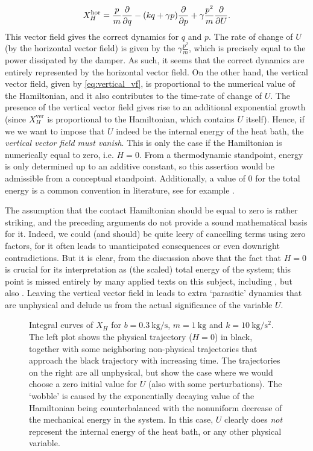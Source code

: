 $$ 
    X^\text{hor}_H = \frac{p}{m}\pdv{}{q} - ( kq + \gamma p)\pdv{}{p} + \gamma \frac{p^2}{m}\pdv{}{U}.
$$
This vector field gives the correct dynamics for $q$ and $p$. The rate of change of $U$ (by the horizontal vector field) is given by the $ 
\gamma \tfrac{p^2}{m}$, which is precisely equal to the power dissipated by the damper. As such, it seems that the correct dynamics are entirely represented by the horizontal vector field. On the other hand, the vertical vector field, given by \cref{eq:vertical_vf}, is proportional to the numerical value of the Hamiltonian, and it also contributes to the time-rate of change of $U$. The presence of the vertical vector field gives rise to an additional exponential growth (since $X_H^\text{ver}$ is proportional to the Hamiltonian, which contains $U$ itself). Hence, if we we want to impose that $U$ indeed be the internal energy of the heat bath, the \emph{vertical vector field must vanish}. This is only the case if the Hamiltonian is numerically equal to zero, i.e. $H = 0$. From a thermodynamic standpoint, energy is only determined up to an additive constant, so this assertion would be admissible from a conceptual standpoint. Additionally, a value of 0 for the total energy is a common convention in literature, see for example \citet{Fermi1936}. 

The assumption that the contact Hamiltonian should be equal to zero is rather striking, and the preceding arguments do not provide a sound mathematical basis for it. Indeed, we could (and should) be quite leery of cancelling terms using zero factors, for it often leads to unanticipated consequences or even downright contradictions. But it is clear, from the discussion above that the fact that $H = 0$ is crucial for its interpretation as (the scaled) total energy of the system; this point is missed entirely by many applied texts on this subject, including \citet{Bravetti2017}, but also \citet{valcazar2019}. Leaving the vertical vector field in leads to extra `parasitic' dynamics that are unphysical and delude us from the actual significance of the variable $U$.
\begin{figure}[ht!]
    \centering
    
    \caption{Integral curves of $X_H$ for $b = \SI{0.3}{\kilogram \per \second}$, $ m = \SI{1}{\kilogram}$ and  $k = \SI{10}{\kilogram \per \second \squared}$. The left plot shows the physical trajectory ($H = 0$) in black, together with some neighboring non-physical trajectories that approach the black trajectory with increasing time. The trajectories on the right are all unphysical, but show the case where we would choose a zero initial value for $U$ (also with some perturbations). The `wobble' is caused by the exponentially decaying value of the Hamiltonian being counterbalanced with the nonuniform decrease of the mechanical energy in the system. In this case, $U$ clearly does \emph{not} represent the internal energy of the heat bath, or any other physical variable.}
    \label{fig:dho_trajectories}
\end{figure}

